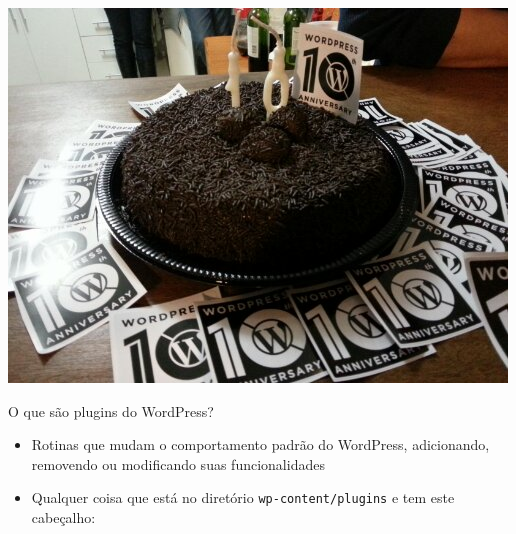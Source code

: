 \documentclass[handout]{beamer}
\begin{document}
\begin{frame}
\begin{center}
  \includegraphics[width=\textwidth]{./img/wp10.jpg}
\end{center}
\end{frame}

\begin{frame}{O que são plugins do WordPress?}
\begin{itemize}
  \pause \item Rotinas que mudam o comportamento padrão do WordPress, adicionando, removendo ou modificando suas funcionalidades
  \pause \item Qualquer coisa que está no diretório \texttt{wp-content/plugins} e tem este cabeçalho:
\end{itemize}
\end{frame}

\begin{frame}
  
\end{frame}
\end{document}
